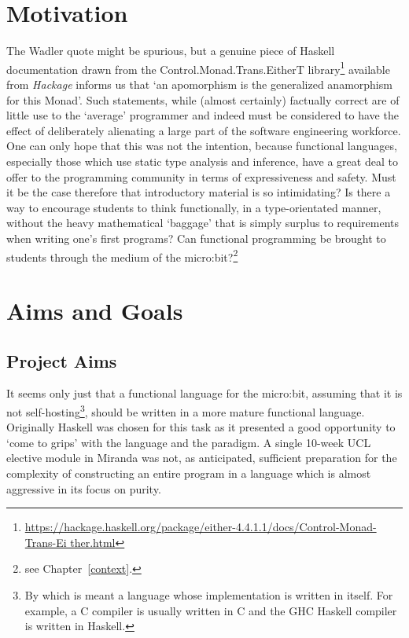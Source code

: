 \documentclass[12pt, a4paper]{report}
\begin{document}
\section{Motivation} 
The Wadler quote might be spurious, but a genuine piece of
Haskell documentation drawn from the Control.Monad.Trans.EitherT
library\footnote{\url{https://hackage.haskell.org/package/either-4.4.1.1/docs/Control-Monad-Trans-Ei
ther.html}} available from \textit{Hackage} informs us that `an apomorphism is the generalized
anamorphism for this Monad'. Such statements, while (almost certainly) factually correct are
of little use to the `average' programmer and indeed must be considered to have the effect of
deliberately alienating a large part of the software engineering workforce. One can only hope
that this was not the intention, because functional languages, especially those which use static
type analysis and inference, have a great deal to offer to the programming community in terms
of expressiveness and safety. Must it be the case therefore that introductory material is so
intimidating? Is there a way to encourage students to think functionally, in a type-orientated
manner, without the heavy mathematical `baggage' that is simply surplus to requirements when writing
one's first programs? Can functional programming be brought to students through the medium of the
micro:bit?\footnote{see Chapter~\ref{context}.}

\section{Aims and Goals}
\subsection{Project Aims}
It seems only just that a functional language for the micro:bit, assuming that it is not
self-hosting\footnote{By which is meant a language whose implementation is written in itself. For
example, a C compiler is usually written in C and the GHC Haskell compiler is written in Haskell.},
should be written in a more mature functional language. Originally Haskell was chosen for this task as it
presented a good opportunity to `come to grips' with the language and the paradigm. A single 10-week
UCL elective module in Miranda was not, as anticipated, sufficient preparation for the complexity of
constructing an entire program in a language which is almost aggressive in its focus on purity.
\end{document}
